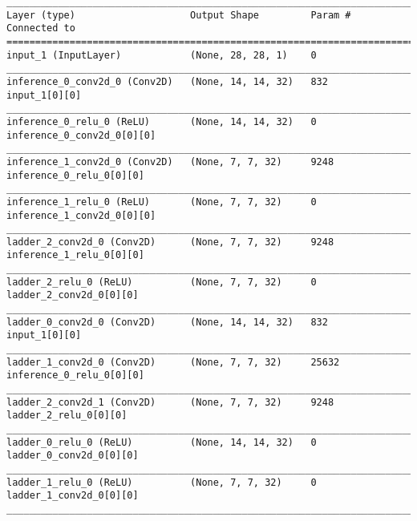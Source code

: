 \begin{lstlisting}[caption={\textsc{Mnist}-VLAE-factor-2 Encoder},captionpos=b,basicstyle=\tiny, label={lst:sparsity-vlae-encoder-28-fm2}]
__________________________________________________________________________________________________
Layer (type)                    Output Shape         Param #     Connected to
==================================================================================================
input_1 (InputLayer)            (None, 28, 28, 1)    0
__________________________________________________________________________________________________
inference_0_conv2d_0 (Conv2D)   (None, 14, 14, 32)   832         input_1[0][0]
__________________________________________________________________________________________________
inference_0_relu_0 (ReLU)       (None, 14, 14, 32)   0           inference_0_conv2d_0[0][0]
__________________________________________________________________________________________________
inference_1_conv2d_0 (Conv2D)   (None, 7, 7, 32)     9248        inference_0_relu_0[0][0]
__________________________________________________________________________________________________
inference_1_relu_0 (ReLU)       (None, 7, 7, 32)     0           inference_1_conv2d_0[0][0]
__________________________________________________________________________________________________
ladder_2_conv2d_0 (Conv2D)      (None, 7, 7, 32)     9248        inference_1_relu_0[0][0]
__________________________________________________________________________________________________
ladder_2_relu_0 (ReLU)          (None, 7, 7, 32)     0           ladder_2_conv2d_0[0][0]
__________________________________________________________________________________________________
ladder_0_conv2d_0 (Conv2D)      (None, 14, 14, 32)   832         input_1[0][0]
__________________________________________________________________________________________________
ladder_1_conv2d_0 (Conv2D)      (None, 7, 7, 32)     25632       inference_0_relu_0[0][0]
__________________________________________________________________________________________________
ladder_2_conv2d_1 (Conv2D)      (None, 7, 7, 32)     9248        ladder_2_relu_0[0][0]
__________________________________________________________________________________________________
ladder_0_relu_0 (ReLU)          (None, 14, 14, 32)   0           ladder_0_conv2d_0[0][0]
__________________________________________________________________________________________________
ladder_1_relu_0 (ReLU)          (None, 7, 7, 32)     0           ladder_1_conv2d_0[0][0]
__________________________________________________________________________________________________

\end{lstlisting}

